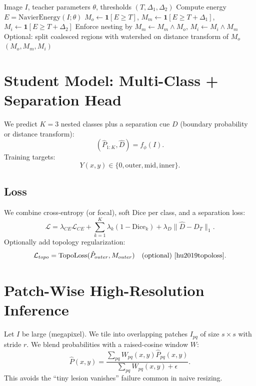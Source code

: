 \documentclass[journal]{IEEEtran}
\begin{document}
\begin{algorithm}
\caption{Nested Iso-Contour Pseudo-Labeling}
\begin{algorithmic}[1]
\REQUIRE Image $I$, teacher parameters $\theta$, thresholds $(T,\Delta_1,\Delta_2)$
\STATE Compute energy $E=\mathrm{NavierEnergy}(I;\theta)$
\STATE $M_o\leftarrow \mathbf{1}[E\ge T]$, $M_m\leftarrow \mathbf{1}[E\ge T+\Delta_1]$, $M_i\leftarrow \mathbf{1}[E\ge T+\Delta_2]$
\STATE Enforce nesting by $M_m\leftarrow M_m\wedge M_o$, $M_i\leftarrow M_i\wedge M_m$
\STATE Optional: split coalesced regions with watershed on distance transform of $M_o$
\RETURN $(M_o,M_m,M_i)$
\end{algorithmic}
\end{algorithm}

\section{Student Model: Multi-Class + Separation Head}
We predict $K=3$ nested classes plus a separation cue $D$ (boundary probability or distance transform):
\begin{equation}
(\hat{P}_{1:K}, \hat{D}) = f_\phi(I).
\end{equation}
Training targets:
\begin{equation}
Y(x,y)\in\{0,\text{outer},\text{mid},\text{inner}\}.
\end{equation}

\subsection{Loss}
We combine cross-entropy (or focal), soft Dice per class, and a separation loss:
\begin{equation}
\mathcal{L} = \lambda_{CE}\mathcal{L}_{CE} + \sum_{k=1}^K \lambda_k(1-\mathrm{Dice}_k) + \lambda_D\lVert \hat{D}-D_T\rVert_1.
\end{equation}
Optionally add topology regularization:
\begin{equation}
\mathcal{L}_{topo}=\mathrm{TopoLoss}(\hat{P}_{outer}, M_{outer}) \quad \text{(optional)}~\cite{hu2019topoloss}.
\end{equation}

\section{Patch-Wise High-Resolution Inference}
Let $I$ be large (megapixel). We tile into overlapping patches $I_{pq}$ of size $s\times s$ with stride $r$.
We blend probabilities with a raised-cosine window $W$:
\begin{equation}
\hat{P}(x,y)=\frac{\sum_{pq} W_{pq}(x,y)\hat{P}_{pq}(x,y)}{\sum_{pq} W_{pq}(x,y)+\epsilon}.
\end{equation}
This avoids the ``tiny lesion vanishes'' failure common in naive resizing.
\end{document}

